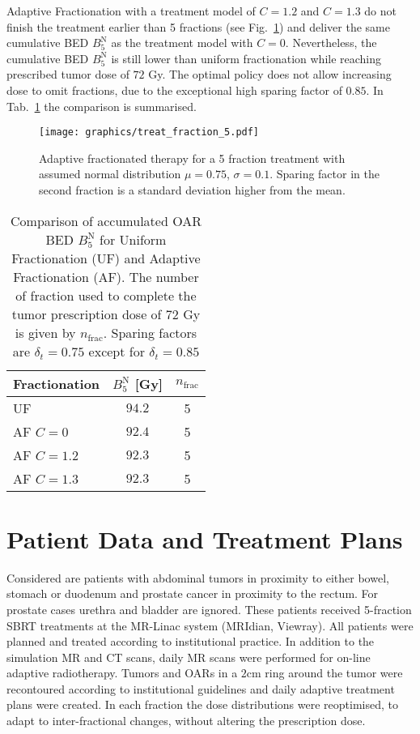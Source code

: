 \documentclass[\relativeRoot/ada.tex]{subfiles}
\begin{document}
Adaptive Fractionation with a treatment model of $C=1.2$ and $C=1.3$ do not finish the treatment earlier than 5 fractions (see Fig.~\ref{fig:treat_fraction_5}) and deliver the same cumulative BED $B_5^{\text{N}}$ as the treatment model with $C=0$. Nevertheless, the cumulative BED $B_5^{\text{N}}$ is still lower than uniform fractionation while reaching prescribed tumor dose of $72$ Gy. The optimal policy does not allow increasing dose to omit fractions, due to the exceptional high sparing factor of $0.85$. In Tab.~\ref{tab:result_treat_fraction_5} the comparison is summarised.

\begin{figure}[!htb]
    \centering
    \texttt{[image: graphics/treat\_fraction\_5.pdf]}
    \caption{Adaptive fractionated therapy for a 5 fraction treatment with assumed normal distribution $\mu=0.75$, $\sigma=0.1$. Sparing factor in the second fraction is a standard deviation higher from the mean.}
    \label{fig:treat_fraction_5}
\end{figure}

\begin{table}[!htb]
    \centering
    \caption{Comparison of accumulated OAR BED $B_5^{\text{N}}$ for Uniform Fractionation (UF) and Adaptive Fractionation (AF). The number of fraction used to complete the tumor prescription dose of $72$ Gy is given by $n_{\text{frac}}$. Sparing factors are $\delta_t=0.75$ except for $\delta_t=0.85$}
    \begin{tabular}{l|cc}
    \toprule
        Fractionation & $B_5^{\text{N}}$ [Gy] & $n_{\text{frac}}$ \\
    \midrule
       UF &  $94.2$ & 5 \\
       AF $C=0$ & $92.4$ & 5 \\
       AF $C=1.2$ & $92.3$ & 5 \\
       AF $C=1.3$ & $92.3$ & 5 \\
     
    \bottomrule
    \end{tabular}
    \label{tab:result_treat_fraction_5}
\end{table}

\section{Patient Data and Treatment Plans}

Considered are patients with abdominal tumors in proximity to either bowel, stomach or duodenum and prostate cancer in proximity to the rectum. For prostate cases urethra and bladder are ignored. These patients received 5-fraction SBRT treatments at the MR-Linac system (MRIdian, Viewray). All patients were planned and treated according to institutional practice. In addition to the simulation MR and CT scans, daily MR scans were performed for on-line adaptive radiotherapy. Tumors and OARs in a $2$cm ring around the tumor were recontoured according to institutional guidelines and daily adaptive treatment plans were created. In each fraction the dose distributions were reoptimised, to adapt to inter-fractional changes, without altering the prescription dose.
\end{document}
